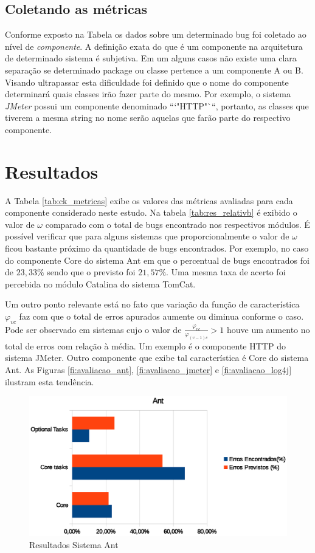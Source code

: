 \documentclass[12pt]{article}
\begin{document}
\subsection{Coletando as métricas}
\label{subsec:analise_coleta_metricas}
Conforme exposto na Tabela \label{tab:campos} os dados sobre um determinado bug
foi coletado ao nível de \textit{componente}{}. A definição exata do que é um
componente na arquitetura de determinado sistema é subjetiva. Em um alguns casos
não existe uma clara separação se determinado package ou classe pertence a um
componente A ou B. Visando ultrapassar esta dificuldade foi definido que o nome
do componente determinará quais classes irão fazer parte do mesmo. Por exemplo,
o sistema \textit{JMeter} possui um componente denominado \textit{}```"HTTP"```,
portanto, as classes que tiverem a mesma string no nome serão aquelas que farão
parte do respectivo componente. 

\section{Resultados}
\label{sec:resultados}

A Tabela \ref{tab:ck_metricas} exibe os valores das métricas avaliadas para cada
componente considerado neste estudo. Na tabela \ref{tab:res_relativb} é exibido
o valor de $\omega$ comparado com o total de bugs encontrado nos respectivos
módulos. É possível verificar que para alguns
sistemas que proporcionalmente o valor de $\omega$ ficou bastante próximo da quantidade de bugs
encontrados. Por exemplo, no caso do componente Core do sistema Ant em que o
percentual de bugs encontrados foi de $23,33\%$ sendo que o previsto foi
$21,57\%$. Uma mesma taxa de acerto foi percebida no módulo Catalina do sistema
TomCat.

Um outro ponto relevante está no fato que variação da função de característica
$\varphi_{vc}$ faz com que o total de erros apurados aumente ou diminua conforme
o caso. Pode ser observado em sistemas cujo o valor de $
\frac{\varphi_{vc}}{\varphi_{(v-1)c}} > 1$ houve um aumento no total de erros
com relação à média. Um exemplo é o componente HTTP do sistema JMeter. Outro
componente que exibe tal característica é Core do sistema Ant. As Figuras
\ref{fi:avaliacao_ant}, \ref{fi:avaliacao_jmeter} e \ref{fi:avaliacao_log4j}
ilustram esta tendência.

\begin{figure}[htbp]
\centering
\includegraphics[width=.80\textwidth]{../img/graph_ant.eps}
\caption{Resultados Sistema Ant}
\label{fig:avalicao_ant}
\end{figure}
\end{document}
